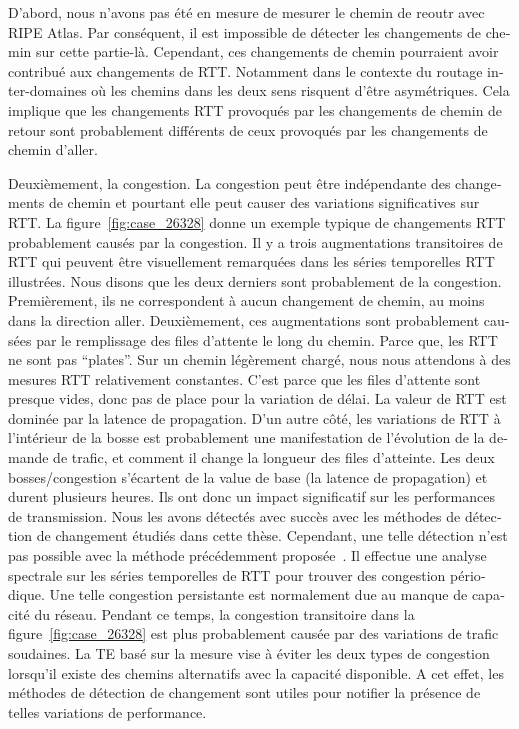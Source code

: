 \begin{otherlanguage}{french}
D'abord, nous n'avons pas été en mesure de mesurer le chemin de reoutr avec RIPE Atlas.
Par conséquent, il est impossible de détecter les changements de chemin sur cette partie-là.
Cependant, ces changements de chemin pourraient avoir contribué aux changements de RTT.
Notamment dans le contexte du routage inter-domaines où les chemins dans les deux sens risquent d'être asymétriques.
Cela implique que les changements RTT provoqués par les changements de chemin de retour sont probablement différents de ceux provoqués par les changements de chemin d'aller.

Deuxièmement, la congestion.
La congestion peut être indépendante des changements de chemin et pourtant elle peut causer des variations significatives sur RTT.
La figure~\ref{fig:case_26328} donne un exemple typique de changements RTT probablement causés par la congestion.
Il y a trois augmentations transitoires de RTT qui peuvent être visuellement remarquées dans les séries temporelles RTT illustrées.
Nous disons que les deux derniers sont probablement de la congestion.
Premièrement, ils ne correspondent à aucun changement de chemin, au moins dans la direction aller.
Deuxièmement, ces augmentations sont probablement causées par le remplissage des files d'attente le long du chemin.
Parce que, les RTT ne sont pas ``plates''.
Sur un chemin légèrement chargé, nous nous attendons à des mesures RTT relativement constantes.
C'est parce que les files d'attente sont presque vides, donc pas de place pour la variation de délai.
La valeur de RTT est dominée par la latence de propagation.
D'un autre côté, les variations de RTT à l'intérieur de la bosse est probablement une manifestation de l'évolution de la demande de trafic, et comment il change la longueur des files d'atteinte.
Les deux bosses/congestion s'écartent de la value de base (la latence de propagation) et durent plusieurs heures.
Ils ont donc un impact significatif sur les performances de transmission.
Nous les avons détectés avec succès avec les méthodes de détection de changement étudiés dans cette thèse.
Cependant, une telle détection n'est pas possible avec la méthode précédemment proposée~\cite{Luckie2014}.
Il effectue une analyse spectrale sur les séries temporelles de RTT pour trouver des congestion périodique.
Une telle congestion persistante est normalement due au manque de capacité du réseau.
Pendant ce temps, la congestion transitoire dans la figure~\ref {fig:case_26328} est plus probablement causée par des variations de trafic soudaines.
La TE basé sur la mesure vise à éviter les deux types de congestion lorsqu'il existe des chemins alternatifs avec la capacité disponible.
A cet effet, les méthodes de détection de changement sont utiles pour notifier la présence de telles variations de performance.


\end{otherlanguage}
